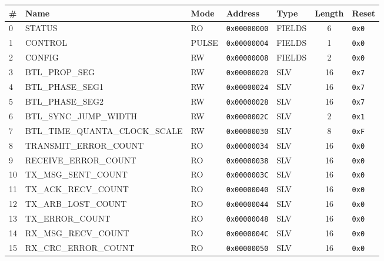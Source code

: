 \documentclass{article}
\begin{document}
\begin{table}[h!]
  \begin{center}
    \label{tab:table1}
    \begin{tabularx}{\linewidth}{|l|X|l|l|l|c|l|}
      \hline
      \textbf{\#} & \textbf{Name} & \textbf{Mode} & \textbf{Address} & \textbf{Type} & \textbf{Length} &
      \textbf{Reset} \\
      \hline
      0 & STATUS & RO & \texttt{0x00000000} & FIELDS & 6 & \texttt{0x0} \\
      \hline
      1 & CONTROL & PULSE & \texttt{0x00000004} & FIELDS & 1 & \texttt{0x0} \\
      \hline
      2 & CONFIG & RW & \texttt{0x00000008} & FIELDS & 2 & \texttt{0x0} \\
      \hline
      3 & BTL{\_}PROP{\_}SEG & RW & \texttt{0x00000020} & SLV & 16 & \texttt{0x7} \\
      \hline
      4 & BTL{\_}PHASE{\_}SEG1 & RW & \texttt{0x00000024} & SLV & 16 & \texttt{0x7} \\
      \hline
      5 & BTL{\_}PHASE{\_}SEG2 & RW & \texttt{0x00000028} & SLV & 16 & \texttt{0x7} \\
      \hline
      6 & BTL{\_}SYNC{\_}JUMP{\_}WIDTH & RW & \texttt{0x0000002C} & SLV & 2 & \texttt{0x1} \\
      \hline
      7 & BTL{\_}TIME{\_}QUANTA{\_}CLOCK{\_}SCALE & RW & \texttt{0x00000030} & SLV & 8 & \texttt{0xF} \\
      \hline
      8 & TRANSMIT{\_}ERROR{\_}COUNT & RO & \texttt{0x00000034} & SLV & 16 & \texttt{0x0} \\
      \hline
      9 & RECEIVE{\_}ERROR{\_}COUNT & RO & \texttt{0x00000038} & SLV & 16 & \texttt{0x0} \\
      \hline
      10 & TX{\_}MSG{\_}SENT{\_}COUNT & RO & \texttt{0x0000003C} & SLV & 16 & \texttt{0x0} \\
      \hline
      11 & TX{\_}ACK{\_}RECV{\_}COUNT & RO & \texttt{0x00000040} & SLV & 16 & \texttt{0x0} \\
      \hline
      12 & TX{\_}ARB{\_}LOST{\_}COUNT & RO & \texttt{0x00000044} & SLV & 16 & \texttt{0x0} \\
      \hline
      13 & TX{\_}ERROR{\_}COUNT & RO & \texttt{0x00000048} & SLV & 16 & \texttt{0x0} \\
      \hline
      14 & RX{\_}MSG{\_}RECV{\_}COUNT & RO & \texttt{0x0000004C} & SLV & 16 & \texttt{0x0} \\
      \hline
      15 & RX{\_}CRC{\_}ERROR{\_}COUNT & RO & \texttt{0x00000050} & SLV & 16 & \texttt{0x0} \\

\end{tabularx}
\end{center}
\end{table}
\end{document}
